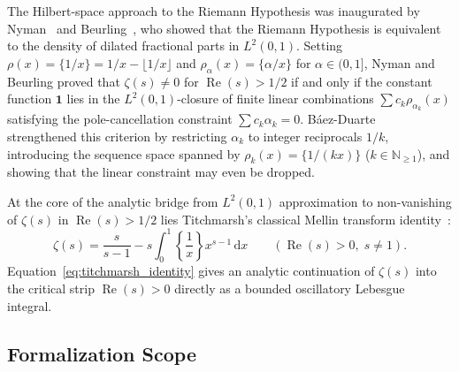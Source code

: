 \documentclass[11pt,a4paper]{article}
\theoremstyle{definition}
\newcommand{\dee}{\mathrm{d}}
\newcommand{\Nset}{\mathbb{N}}
\begin{document}
The Hilbert-space approach to the Riemann Hypothesis was inaugurated by Nyman~\cite{Nyman1950} and Beurling~\cite{Beurling1955}, who showed that the Riemann Hypothesis is equivalent to the density of dilated fractional parts in $L^2(0, 1)$. Setting $\rho(x) = \{1/x\} = 1/x - \lfloor 1/x \rfloor$ and $\rho_\alpha(x) = \{\alpha/x\}$ for $\alpha \in (0, 1]$, Nyman and Beurling proved that $\zeta(s) \neq 0$ for $\operatorname{Re}(s) > 1/2$ if and only if the constant function $\mathbf{1}$ lies in the $L^2(0, 1)$-closure of finite linear combinations $\sum c_k \rho_{\alpha_k}(x)$ satisfying the pole-cancellation constraint $\sum c_k \alpha_k = 0$. B\'aez-Duarte~\cite{BaezDuarte1999,BaezDuarte2003} strengthened this criterion by restricting $\alpha_k$ to integer reciprocals $1/k$, introducing the sequence space spanned by $\rho_k(x) = \{1/(kx)\}$ ($k \in \Nset_{\ge 1}$), and showing that the linear constraint may even be dropped.

At the core of the analytic bridge from $L^2(0, 1)$ approximation to non-vanishing of $\zeta(s)$ in $\operatorname{Re}(s) > 1/2$ lies Titchmarsh's classical Mellin transform identity~\cite[\S 2.1.5]{Titchmarsh1986}:
\begin{equation}\label{eq:titchmarsh_identity}
\zeta(s) = \frac{s}{s - 1} - s \int_0^1 \left\{ \frac{1}{x} \right\} x^{s - 1} \,\dee x \qquad (\operatorname{Re}(s) > 0, \; s \neq 1).
\end{equation}
Equation~\eqref{eq:titchmarsh_identity} gives an analytic continuation of $\zeta(s)$ into the critical strip $\operatorname{Re}(s) > 0$ directly as a bounded oscillatory Lebesgue integral.

\subsection{Formalization Scope}
\end{document}
